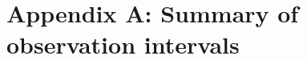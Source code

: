 \chapter{Appendix A: Summary of observation intervals}\label{appendix:observation-periods}

\renewcommand{\thechapter}{A}
\setcounter{table}{0}
\renewcommand{\thetable}{A.\arabic{table}}

\begin{landscape}
\begin{spacing}{.5}
    
    \label{tab:msh-observations}
\end{spacing}
\end{landscape}

\begin{landscape}
\begin{spacing}{.5}
    
    \label{tab:sw-observations}
\end{spacing}
\end{landscape}

\begin{landscape}
\begin{spacing}{.5}
    
\end{spacing}
\end{landscape}